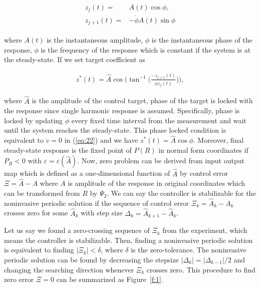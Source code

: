 \documentclass[openacc]{rsproca_new}%
\def\epsilon{\varepsilon}
\newcommand{\Eref}[1]{(\ref{#1})}
\newcommand{\Fref}[1]{Figure~\ref{#1}}
\begin{document}
\begin{align}\label{eq:25}
\begin{split}
z_{j}(t)=&A(t)\cos{\phi},\\
z_{j+1}(t)=&-\dot\phi A(t)\sin{\phi}
\end{split}
\end{align}

\noindent where $A(t)$ is the instantaneous amplitude, $\phi$ is the instantaneous phase of the response, $\dot\phi$ is the frequency of the response which is constant if the system is at the steady-state. If we set target coefficient as

\begin{align}\label{eq:26}
z^*(t)=\hat A\cos\Big(\tan^{-1}\Big({\frac{-z_{j+1}(t)}{ \dot \phi z_{j}(t)}}\Big) \Big),
\end{align}

\noindent where $\hat A$ is the amplitude of the control target, phase of the target is locked with the response since single harmonic response is assumed. Specifically, phase is locked by updating $\dot\phi$ every fixed time interval from the measurement and wait until the system reaches the steady-state. This phase locked condition is equivalent to $\dot v=0$ in \Eref{eq:22} and we have $z^*(t)=\hat A\cos{\phi}$. Moreover, final steady-state response is the fixed point of $P(R)$ in normal form coordinates if $P_R<0$ with $\epsilon=\epsilon(\hat A)$. Now, zero problem can be derived from input output map which is defined as a one-dimensional function of $\hat A$ by control error $\Xi=\hat A - A$ where $A$ is amplitude of the response in original coordinates which can be transformed from $R$ by $\Psi_2$. We can say the controller is stabilizable for the noninvasive periodic solution if the sequence of control error $\Xi_k=\hat A_k-A_k$ crosses zero for some $\hat A_k$ with step size $\Delta_k=\hat A_{k+1}-\hat A_{k}$.

Let us say we found a zero-crossing sequence of $\Xi_k$ from the experiment, which means the controller is stabilizable. Then, finding a noninvasive periodic solution is equivalent to finding  $|\Xi_k|<\delta$, where $\delta$ is the zero-tolerance. The noninvasive periodic solution can be found by decreasing the stepsize $|\Delta_k|=|\Delta_{k-1}|/2$ and changing the searching direction whenever $\Xi_k$ crosses zero. This procedure to find zero error $\Xi=0$ can be summarized as \Fref{f:1}.
\end{document}
